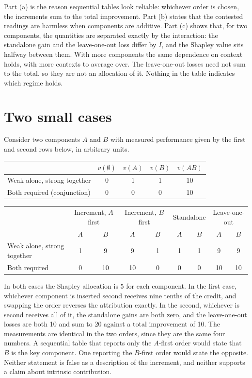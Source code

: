 \documentclass[11pt]{article}
\theoremstyle{plain}
\theoremstyle{remark}
\begin{document}
Part (a) is the reason sequential tables look reliable: whichever order is chosen, the increments sum to the total improvement. Part (b) states that the contested readings are harmless when components are additive. Part (c) shows that, for two components, the quantities are separated exactly by the interaction: the standalone gain and the leave-one-out loss differ by $I$, and the Shapley value sits halfway between them. With more components the same dependence on context holds, with more contexts to average over. The leave-one-out losses need not sum to the total, so they are not an allocation of it. Nothing in the table indicates which regime holds.

\section{Two small cases}\label{sec:toy}

Consider two components $A$ and $B$ with measured performance given by the first and second rows below, in arbitrary units.

\begin{center}
\small
\begin{tabular}{lcccc}
\toprule
 & $v(\emptyset)$ & $v(A)$ & $v(B)$ & $v(AB)$\\
\midrule
Weak alone, strong together & 0 & 1 & 1 & 10\\
Both required (conjunction) & 0 & 0 & 0 & 10\\
\bottomrule
\end{tabular}
\end{center}

\begin{center}
\small
\begin{tabular}{lcccccccc}
\toprule
 & \multicolumn{2}{c}{Increment, $A$ first} & \multicolumn{2}{c}{Increment, $B$ first} & \multicolumn{2}{c}{Standalone} & \multicolumn{2}{c}{Leave-one-out}\\
 & $A$ & $B$ & $A$ & $B$ & $A$ & $B$ & $A$ & $B$\\
\midrule
Weak alone, strong together & 1 & 9 & 9 & 1 & 1 & 1 & 9 & 9\\
Both required & 0 & 10 & 10 & 0 & 0 & 0 & 10 & 10\\
\bottomrule
\end{tabular}
\end{center}

In both cases the Shapley allocation is 5 for each component. In the first case, whichever component is inserted second receives nine tenths of the credit, and swapping the order reverses the attribution exactly. In the second, whichever is second receives all of it, the standalone gains are both zero, and the leave-one-out losses are both 10 and sum to 20 against a total improvement of 10. The measurements are identical in the two orders, since they are the same four numbers. A sequential table that reports only the $A$-first order would state that $B$ is the key component. One reporting the $B$-first order would state the opposite. Neither statement is false as a description of the increment, and neither supports a claim about intrinsic contribution.
\end{document}
